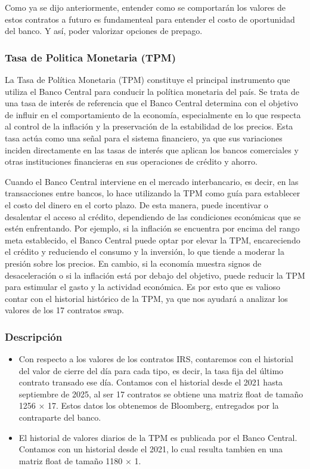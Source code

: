\qquad Como ya se dijo anteriormente, entender como se comportarán los valores de estos contratos a futuro es fundamenteal para entender el costo de oportunidad del banco. Y así, poder valorizar opciones de prepago.

\subsubsection{Tasa de Politica Monetaria (TPM)}

\qquad La Tasa de Política Monetaria (TPM) constituye el principal instrumento que utiliza el Banco Central para conducir la política monetaria del país. Se trata de una tasa de interés de referencia que el Banco Central determina con el objetivo de influir en el comportamiento de la economía, especialmente en lo que respecta al control de la inflación y la preservación de la estabilidad de los precios. Esta tasa actúa como una señal para el sistema financiero, ya que sus variaciones inciden directamente en las tasas de interés que aplican los bancos comerciales y otras instituciones financieras en sus operaciones de crédito y ahorro.

\qquad Cuando el Banco Central interviene en el mercado interbancario, es decir, en las transacciones entre bancos, lo hace utilizando la TPM como guía para establecer el costo del dinero en el corto plazo. De esta manera, puede incentivar o desalentar el acceso al crédito, dependiendo de las condiciones económicas que se estén enfrentando. Por ejemplo, si la inflación se encuentra por encima del rango meta establecido, el Banco Central puede optar por elevar la TPM, encareciendo el crédito y reduciendo el consumo y la inversión, lo que tiende a moderar la presión sobre los precios. En cambio, si la economía muestra signos de desaceleración o si la inflación está por debajo del objetivo, puede reducir la TPM para estimular el gasto y la actividad económica. Es por esto que es valioso contar con el historial histórico de la TPM, ya que nos ayudará a analizar los valores de los 17 contratos swap.

\subsubsection{Descripción}

\begin{itemize}
    \item Con respecto a los valores de los contratos IRS, contaremos con el historial del valor de cierre del día para cada tipo, es decir, la tasa fija del último contrato transado ese día. Contamos con el historial desde el 2021 hasta septiembre de 2025, al ser 17 contratos se obtiene una matriz float de tamaño 1256 $\times$ 17. Estos datos los obtenemos de Bloomberg, entregados por la contraparte del banco.
    \item El historial de valores diarios de la TPM es publicada por el Banco Central. Contamos con un historial desde el 2021, lo cual resulta tambien en una matriz float de tamaño 1180 $\times$ 1.
\end{itemize}

